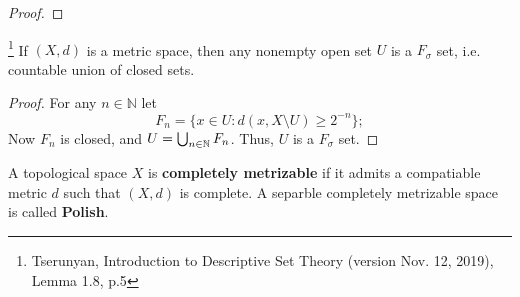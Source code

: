 \begin{proof}
% 

\end{proof}

\begin{lemma}
\footnote{Tserunyan, Introduction to Descriptive Set Theory (version Nov. 12,
2019), Lemma 1.8, p.5}
If $(X,d)$ is a metric space, then any nonempty open set $U$ is a $F_{\sigma}$
set, i.e. countable union of closed sets.
\end{lemma}
\begin{proof}
For any $n\in\mathbb{N}$ let
\[
  F_n = \{ x\in U: d(x,X\setminus U)\ge 2^{-n} \};
\]
Now $F_n$ is closed, and $U=\bigcup_{n\in\Bbb N} F_n$. Thus, $U$ is a
$F_{\sigma}$ set.
\end{proof}

\begin{definition}
A topological space $X$ is \textbf{completely metrizable} if it admits a compatiable
metric $d$ such that $(X,d)$ is complete. A separble completely metrizable space
is called \textbf{Polish}.
\end{definition}

